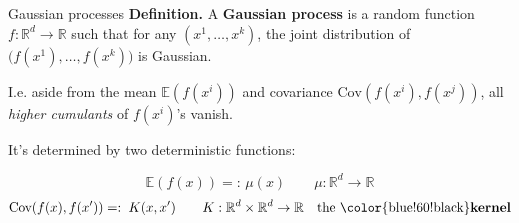 \documentclass[11pt]{beamer}
\newcommand{\E}{\mathbb{E}}
\newcommand{\R}{\mathbb{R}}
\newcommand{\hl}[1]{{\color{blue!60!black}\textbf{#1}}}
\begin{document}
\begin{frame}{Gaussian processes}
  \textbf{Definition.}  A \hl{Gaussian process}
  is a random function $f: \R^d \to \R$ such that for any
  $(x^1, \dots, x^k)$, the joint distribution of \\
  \hspace{1in} $\big(f(x^1), \dots, f(x^k)\big)$ \qquad  is Gaussian.  \pause
  
  \bigskip
  
  I.e. aside from the mean $\E(f(x^i))$ and covariance $\text{Cov}(f(x^i),f(x^j))$, all \emph{higher cumulants} of $f(x^i)$'s vanish. \pause
  
  \bigskip
  
 It's determined by two deterministic functions:
 
 \[ \E(f(x)) =:\, \mu(x) \qquad \mu:\R^d\to \R \]
 \[  \text{Cov}(f(x),f(x')) =: \; K(x,x') \qquad K: \R^d\times\R^d \to \R\quad  \text{the \hl{kernel}} \]
  
  \end{frame}




%
\end{document}
